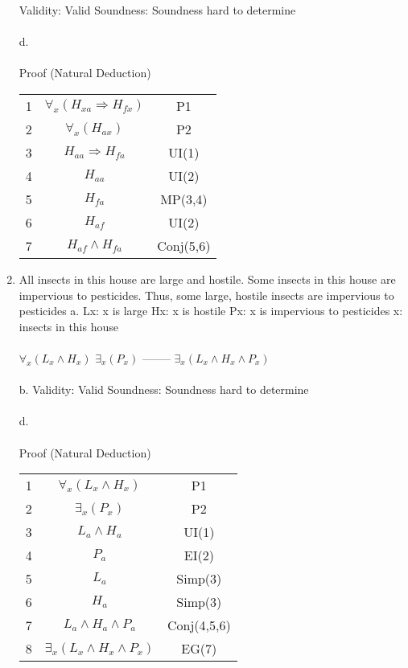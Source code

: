 \documentclass[]{article}
\begin{document}
\begin{enumerate}
    \newline Validity: Valid
    \newline Soundness: Soundness hard to determine
    \\\\d.
    \\\\ Proof (Natural Deduction)
    \begin{tabular}{c| c | c}
        1 & $\forall_x (H_{xa}\Rightarrow H_{fx})$ & P1 \\
        2 & $\forall_x(H_{ax})$ & P2 \\
        3 & $H_{aa} \Rightarrow H_{fa}$ & UI(1) \\
        4 & $H_{aa}$ & UI(2) \\
        5 & $H_{fa}$ & MP(3,4) \\
        6 & $H_{af}$ & UI(2) \\
        7 & $H_{af}\land H_{fa}$ & Conj(5,6)
    \end{tabular}
    

    \item All insects in this house are large and hostile. Some insects in this house are impervious to pesticides. Thus, some large, hostile insects are impervious to pesticides
    \newline a.
    \newline Lx: x is large
    \newline Hx: x is hostile
    \newline Px: x is impervious to pesticides
    \newline x: insects in this house
    \\\\ $\forall_x (L_x \land H_x)$
    \newline $\exists_x (P_x)$
    \newline --------
    \newline $\exists_x (L_x \land H_x \land P_x)$
    \\\\b.
    \newline Validity: Valid
    \newline Soundness: Soundness hard to determine
    \\\\d.
    \\\\ Proof (Natural Deduction)
    \begin{tabular}{c| c | c}
        1 & $\forall_x (L_x \land H_x)$ & P1 \\
        2 & $\exists_x (P_x)$ & P2 \\
        3 & $L_a\land H_a$ & UI(1) \\
        4 & $P_a$ & EI(2) \\
        5 & $L_a$ & Simp(3) \\
        6 & $H_a$ & Simp(3) \\
        7 & $L_a \land H_a \land P_a$ & Conj(4,5,6) \\
        8 & $\exists_x(L_x \land H_x \land P_x)$ & EG(7) \\
    \end{tabular}
    

\end{enumerate}
\end{document}
